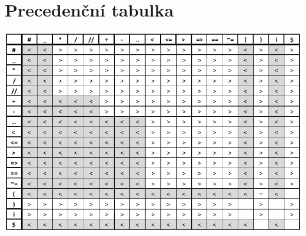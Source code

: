 \documentclass[11pt]{article}
\begin{document}
    \section{Precedenční tabulka}
        \includegraphics[width=1\linewidth]{precedenční tabulka.png}
        \pagebreak
\end{document}
